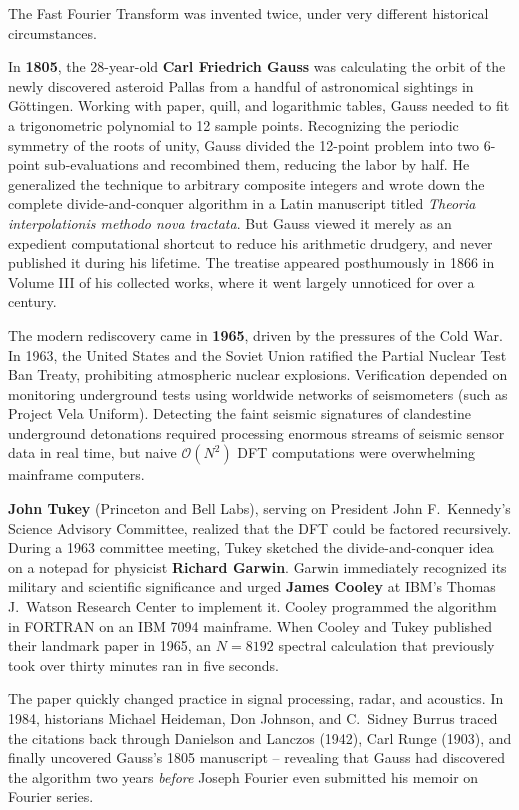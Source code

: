 \begin{historybox}
The Fast Fourier Transform was invented twice, under very different historical
circumstances.

In \textbf{1805}, the 28-year-old \textbf{Carl Friedrich Gauss} was calculating the orbit of the
newly discovered asteroid Pallas from a handful of astronomical sightings in G\"{o}ttingen.
Working with paper, quill, and logarithmic tables, Gauss needed to fit a trigonometric polynomial
to 12 sample points. Recognizing the periodic symmetry of the roots of unity, Gauss divided the
12-point problem into two 6-point sub-evaluations and recombined them, reducing the labor by half.
He generalized the technique to arbitrary composite integers and wrote down the complete
divide-and-conquer algorithm in a Latin manuscript titled \emph{Theoria interpolationis methodo
nova tractata}. But Gauss viewed it merely as an expedient computational shortcut to reduce his
arithmetic drudgery, and never published it during his lifetime. The treatise appeared posthumously
in 1866 in Volume III of his collected works, where it went largely unnoticed for over a
century.

The modern rediscovery came in \textbf{1965}, driven by the pressures of the Cold War.
In 1963, the United States and the Soviet Union ratified the Partial Nuclear Test Ban Treaty,
prohibiting atmospheric nuclear explosions. Verification depended on monitoring underground tests
using worldwide networks of seismometers (such as Project Vela Uniform). Detecting the faint seismic
signatures of clandestine underground detonations required processing enormous streams of seismic
sensor data in real time, but naive $\mathcal{O}(N^2)$ DFT computations were overwhelming mainframe
computers.

\textbf{John Tukey} (Princeton and Bell Labs), serving on President John F.\ Kennedy's Science
Advisory Committee, realized that the DFT could be factored recursively. During a 1963 committee
meeting, Tukey sketched the divide-and-conquer idea on a notepad for physicist \textbf{Richard Garwin}.
Garwin immediately recognized its military and scientific significance and urged \textbf{James Cooley}
at IBM's Thomas J.\ Watson Research Center to implement it. Cooley programmed the algorithm in FORTRAN
on an IBM 7094 mainframe. When Cooley and Tukey published their landmark paper in 1965, an $N=8192$
spectral calculation that previously took over thirty minutes ran in five seconds.

The paper quickly changed practice in signal processing, radar, and acoustics. In 1984,
historians Michael Heideman, Don Johnson, and C.\ Sidney Burrus traced the citations back through
Danielson and Lanczos (1942), Carl Runge (1903), and finally uncovered Gauss's 1805 manuscript --
revealing that Gauss had discovered the algorithm two
years \emph{before} Joseph Fourier even submitted his memoir on Fourier series.
\end{historybox}

